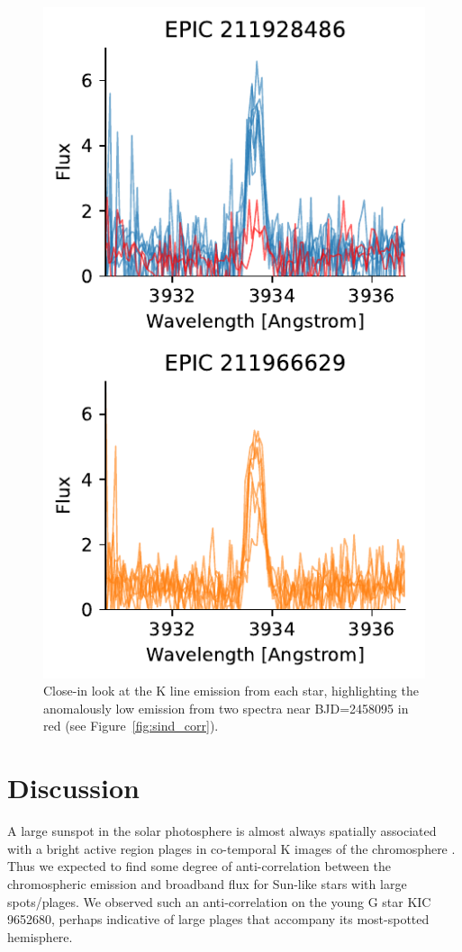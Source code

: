 \begin{figure}
    \centering
    \includegraphics{nephelion/quicklook_k.pdf}
    \caption{Close-in look at the  K line emission from each star, highlighting the anomalously low emission from two spectra near BJD=2458095 in red (see Figure~\ref{fig:sind_corr}).}
    \label{fig:kline}
\end{figure}

\section{Discussion} \label{sec:discussion}

A large sunspot in the solar photosphere is almost always spatially associated with a bright active region plages in co-temporal  K images of the chromosphere \citep{Stix1989, Mandal2017}. Thus we expected to find some degree of anti-correlation between the chromospheric emission and broadband flux for Sun-like stars with large spots/plages. We observed such an anti-correlation on the young G star KIC 9652680, perhaps indicative of large plages that accompany its most-spotted hemisphere. 

